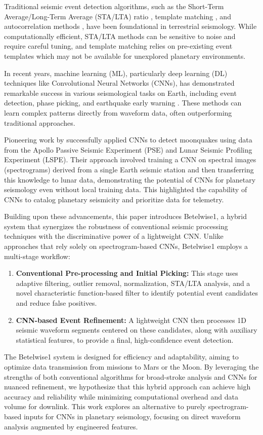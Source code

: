 \documentclass[11pt,a4paper]{article}
\begin{document}
Traditional seismic event detection algorithms, such as the Short-Term Average/Long-Term Average (STA/LTA) ratio \citep{allen1982automatic}, template matching \citep{gibbons2006detection}, and autocorrelation methods \citep{brown2008autocorrelation}, have been foundational in terrestrial seismology. While computationally efficient, STA/LTA methods can be sensitive to noise and require careful tuning, and template matching relies on pre-existing event templates which may not be available for unexplored planetary environments.

In recent years, machine learning (ML), particularly deep learning (DL) techniques like Convolutional Neural Networks (CNNs), has demonstrated remarkable success in various seismological tasks on Earth, including event detection, phase picking, and earthquake early warning \citep{perol2018convnetquake, ross2018p, ross2018generalized, meier2019reliable}. These methods can learn complex patterns directly from waveform data, often outperforming traditional approaches.

Pioneering work by \citet{civilini2021detecting} successfully applied CNNs to detect moonquakes using data from the Apollo Passive Seismic Experiment (PSE) and Lunar Seismic Profiling Experiment (LSPE). Their approach involved training a CNN on spectral images (spectrograms) derived from a single Earth seismic station and then transferring this knowledge to lunar data, demonstrating the potential of CNNs for planetary seismology even without local training data. This highlighted the capability of CNNs to catalog planetary seismicity and prioritize data for telemetry.

Building upon these advancements, this paper introduces Betelwise1, a hybrid system that synergizes the robustness of conventional seismic processing techniques with the discriminative power of a lightweight CNN. Unlike approaches that rely solely on spectrogram-based CNNs, Betelwise1 employs a multi-stage workflow:
\begin{enumerate}
    \item \textbf{Conventional Pre-processing and Initial Picking:} This stage uses adaptive filtering, outlier removal, normalization, STA/LTA analysis, and a novel characteristic function-based filter to identify potential event candidates and reduce false positives.
    \item \textbf{CNN-based Event Refinement:} A lightweight CNN then processes 1D seismic waveform segments centered on these candidates, along with auxiliary statistical features, to provide a final, high-confidence event detection.
\end{enumerate}
The Betelwise1 system is designed for efficiency and adaptability, aiming to optimize data transmission from missions to Mars or the Moon. By leveraging the strengths of both conventional algorithms for broad-stroke analysis and CNNs for nuanced refinement, we hypothesize that this hybrid approach can achieve high accuracy and reliability while minimizing computational overhead and data volume for downlink. This work explores an alternative to purely spectrogram-based inputs for CNNs in planetary seismology, focusing on direct waveform analysis augmented by engineered features.
\end{document}
